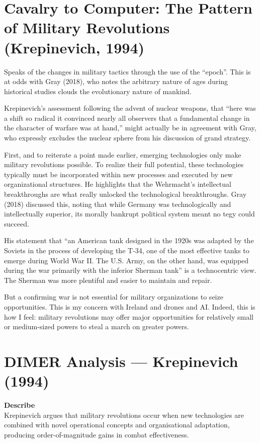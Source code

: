 \section*{Cavalry to Computer: The Pattern of Military Revolutions (Krepinevich, 1994)}

\parencite{KREPINEVICH_1994}Speaks of the changes in military tactics through the use of the ``epoch''. This is at odds with Gray (2018), who notes the arbitrary nature of ages during historical studies clouds the evolutionary nature of mankind.  

Krepinevich’s assessment following the advent of nuclear weapons, that ``here was a shift so radical it convinced nearly all observers that a fundamental change in the character of warfare was at hand,'' might actually be in agreement with Gray, who expressly excludes the nuclear sphere from his discussion of grand strategy.  

First, and to reiterate a point made earlier, emerging technologies only make military revolutions possible. To realize their full potential, these technologies typically must be incorporated within new processes and executed by new organizational structures. He highlights that the Wehrmacht's intellectual breakthroughs are what really unlocked the technological breakthroughs. Gray (2018) discussed this, noting that while Germany was technologically and intellectually superior, its morally bankrupt political system meant no tegy could succeed.  

His statement that ``an American tank designed in the 1920s was adapted by the Soviets in the process of developing the T-34, one of the most effective tanks to emerge during World War II. The U.S. Army, on the other hand, was equipped during the war primarily with the inferior Sherman tank'' is a technocentric view. The Sherman was more plentiful and easier to maintain and repair.  

But a confirming war is not essential for military organizations to seize opportunities. This is my concern with Ireland and drones and AI. Indeed, this is how I feel: military revolutions may offer major opportunities for relatively small or medium-sized powers to steal a march on greater powers.  

\section*{DIMER Analysis — Krepinevich (1994)}

\textbf{Describe} \\
Krepinevich argues that military revolutions occur when new technologies are combined with novel operational concepts and organisational adaptation, producing order-of-magnitude gains in combat effectiveness.  

